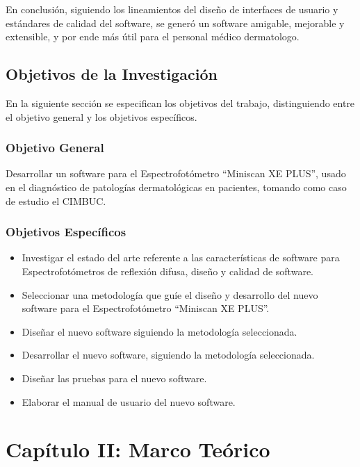 \documentclass[12pt, a4paper]{article}
\begin{document}
En conclusi\'{o}n, siguiendo los lineamientos del dise\~{n}o de interfaces de usuario y est\'{a}ndares de calidad del software, se gener\'{o} un software amigable, mejorable y extensible, y por ende m\'{a}s \'{u}til para el personal m\'{e}dico dermatologo.

\pagebreak

\subsection{Objetivos de la Investigaci\'{o}n}
En la siguiente secci\'{o}n se especifican los objetivos del trabajo, distinguiendo entre el objetivo general y los objetivos espec\'{i}ficos.
	\subsubsection{Objetivo General}
	Desarrollar un software para el Espectrofot\'{o}metro ``Miniscan XE PLUS'', usado en el diagn\'{o}stico de patolog\'{i}as dermatol\'{o}gicas en pacientes, tomando como caso de estudio el CIMBUC.
	\subsubsection{Objetivos Espec\'{i}ficos}
	\begin{itemize}
		\item Investigar el estado del arte referente a las caracter\'{i}sticas de software para Espectrofot\'{o}metros de reflexi\'{o}n difusa, dise\~{n}o y calidad de software.
		\item Seleccionar una metodolog\'{i}a que gu\'{i}e el dise\~{n}o y desarrollo del nuevo software para el Espectrofot\'{o}metro ``Miniscan XE PLUS''.
		\item Dise\~{n}ar el nuevo software siguiendo la metodolog\'{i}a seleccionada.
		\item Desarrollar el nuevo software, siguiendo la metodolog\'{i}a seleccionada.
		\item Dise\~{n}ar las pruebas para el nuevo software.
		\item Elaborar el manual de usuario del nuevo software.
	\end{itemize}
\pagebreak
\section{Cap\'{i}tulo II: Marco Te\'{o}rico}
\end{document}
